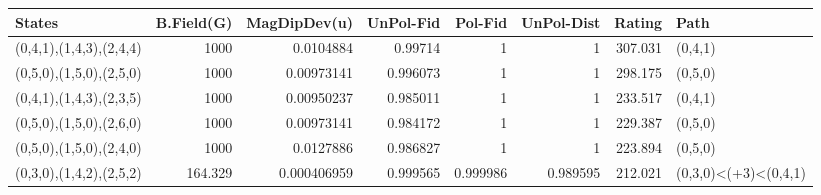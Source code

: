 \begin{tabular}{lrrrrrrl}
\hline
 States                  &   B.Field(G) &   MagDipDev(u) &   UnPol-Fid &   Pol-Fid &   UnPol-Dist &   Rating & Path                 \\
\hline
 (0,4,1),(1,4,3),(2,4,4) &     1000     &    0.0104884   &    0.99714  &  1        &     1        &  307.031 & (0,4,1)              \\
 (0,5,0),(1,5,0),(2,5,0) &     1000     &    0.00973141  &    0.996073 &  1        &     1        &  298.175 & (0,5,0)              \\
 (0,4,1),(1,4,3),(2,3,5) &     1000     &    0.00950237  &    0.985011 &  1        &     1        &  233.517 & (0,4,1)              \\
 (0,5,0),(1,5,0),(2,6,0) &     1000     &    0.00973141  &    0.984172 &  1        &     1        &  229.387 & (0,5,0)              \\
 (0,5,0),(1,5,0),(2,4,0) &     1000     &    0.0127886   &    0.986827 &  1        &     1        &  223.894 & (0,5,0)              \\
 (0,3,0),(1,4,2),(2,5,2) &      164.329 &    0.000406959 &    0.999565 &  0.999986 &     0.989595 &  212.021 & (0,3,0)<(+3)<(0,4,1) \\
\hline
\end{tabular}